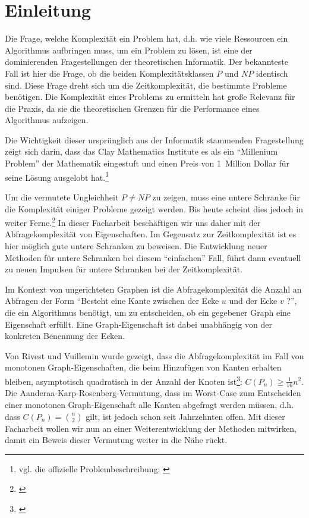 \documentclass[10pt,a4paper, footheight=1mm]{scrreprt}
\theoremstyle{definition}
\begin{document}



\tableofcontents
\thispagestyle{empty}

\chapter{Einleitung}
Die Frage, welche Komplexität ein Problem hat, d.h.
wie viele Ressourcen ein Algorithmus aufbringen muss,
um ein Problem zu lösen, ist eine der dominierenden
Fragestellungen der theoretischen Informatik.
Der bekannteste Fall ist hier die Frage, ob die beiden
Komplexitätsklassen $P$ und $NP$ identisch sind. Diese
Frage dreht sich um die Zeitkomplexität, die bestimmte
Probleme benötigen. Die Komplexität eines Problems zu ermitteln hat
große Relevanz für die Praxis, da sie die theoretischen
Grenzen für die Performance eines Algorithmus aufzeigen.

Die Wichtigkeit dieser ursprünglich aus der Informatik
stammenden Fragestellung zeigt sich darin, dass das Clay
Mathematics Institute es als ein "`Millenium Problem"'
der Mathematik eingestuft und einen Preis von
1~Million Dollar für seine Lösung ausgelobt hat.\footnote{
vgl. die offizielle Problembeschreibung:
\cite{PvsNPOfficial}} 

Um die vermutete Ungleichheit $P\neq NP$ zu zeigen,
muss eine untere Schranke für die Komplexität einiger
Probleme gezeigt werden. Bis heute scheint dies jedoch
in weiter Ferne.\footnote{\cite{PvsNP}}
In dieser Facharbeit beschäftigen wir uns daher mit
der  Abfragekomplexität von Eigenschaften. Im Gegensatz
zur Zeitkomplexität ist es hier möglich gute
untere Schranken zu beweisen. Die Entwicklung
neuer Methoden für untere Schranken bei diesem "`einfachen"' Fall,
führt dann eventuell zu neuen Impulsen für untere
Schranken bei der Zeitkomplexität.

Im Kontext von ungerichteten Graphen
ist die Abfragekomplexität die Anzahl
an Abfragen der Form "`Besteht eine Kante zwischen
der Ecke $u$ und der Ecke $v$ ?"', die ein Algorithmus
benötigt, um zu entscheiden, ob ein gegebener Graph
eine Eigenschaft erfüllt. Eine Graph-Eigenschaft ist
dabei unabhängig von der konkreten Benennung der Ecken.

Von Rivest und Vuillemin wurde gezeigt,
dass die Abfragekomplexität
im Fall von monotonen Graph-Eigenschaften, die beim 
Hinzufügen von Kanten erhalten bleiben, asymptotisch
quadratisch in der Anzahl der Knoten
ist\footnote{\cite{Rivest}}: $C(P_n) \geq \frac{1}{16}n^2$.
Die Aanderaa-Karp-Rosenberg-Vermutung, dass im Worst-Case
zum Entscheiden einer monotonen Graph-Eigenschaft
alle Kanten abgefragt werden müssen, d.h. dass
$C(P_n)=\binom{n}{2}$ gilt, ist jedoch schon
seit Jahrzehnten offen. Mit dieser Facharbeit
wollen wir nun an einer Weiterentwicklung der
Methoden mitwirken, damit ein Beweis dieser Vermutung
weiter in die Nähe rückt.
\end{document}

